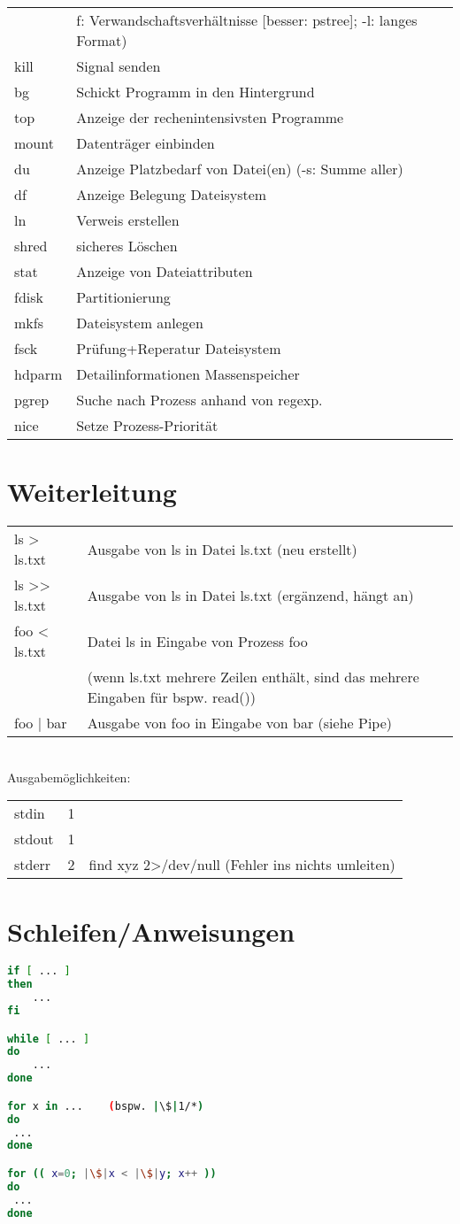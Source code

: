 \documentclass{scrreprt}
\begin{document}
\begin{longtable}[l]{ p{} | p{} }
& f: Verwandschaftsverhältnisse [besser: pstree]; -l: langes Format)\\
kill & Signal senden\\
bg & Schickt Programm in den Hintergrund\\
top & Anzeige der rechenintensivsten Programme\\
mount & Datenträger einbinden\\
du & Anzeige Platzbedarf von Datei(en) (-s: Summe aller)\\
df & Anzeige Belegung Dateisystem\\
ln & Verweis erstellen\\
shred & sicheres Löschen\\
stat & Anzeige von Dateiattributen\\
fdisk & Partitionierung\\
mkfs & Dateisystem anlegen\\
fsck & Prüfung+Reperatur Dateisystem\\
hdparm & Detailinformationen Massenspeicher\\
pgrep & Suche nach Prozess anhand von regexp.\\
nice & Setze Prozess-Priorität
\end{longtable}

\section{Weiterleitung}
\begin{tabular}{p{} p{}}
ls > ls.txt & Ausgabe von ls in Datei ls.txt (neu erstellt)\\
ls >> ls.txt & Ausgabe von ls in Datei ls.txt (ergänzend, hängt an)\\
foo < ls.txt & Datei ls in Eingabe von Prozess foo\\
& (wenn ls.txt mehrere Zeilen enthält, sind das mehrere Eingaben für bspw. read())\\
foo | bar & Ausgabe von foo in Eingabe von bar (siehe Pipe)
\end{tabular}\\
Ausgabemöglichkeiten:\\
\begin{tabular}{l l l}
stdin & 1 &\\
stdout & 1 &\\
stderr & 2 & find xyz 2>/dev/null (Fehler ins nichts umleiten) 
\end{tabular}

\section{Schleifen/Anweisungen}
\begin{lstlisting}[language=bash]
if [ ... ] 
then 
	... 
fi

while [ ... ] 
do 
	... 
done

for x in ...	(bspw. |\$|1/*)
do 
 ...
done

for (( x=0; |\$|x < |\$|y; x++ ))
do
 ...
done
\end{lstlisting}
\end{document}
